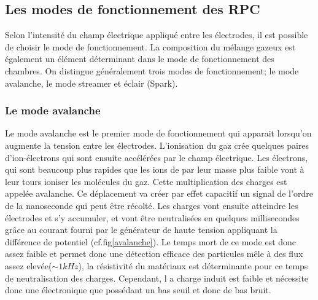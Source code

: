 \subsection{Les modes de fonctionnement des RPC}
Selon l'intensité du champ électrique appliqué  entre les électrodes, il est possible de choisir le mode de fonctionnement. La composition du mélange gazeux est également un élément déterminant dans le mode de fonctionnement des chambres. On distingue généralement trois modes de fonctionnement; le mode avalanche, le mode streamer et éclair (Spark).

\subsubsection{Le mode avalanche}
Le mode avalanche est le premier mode de fonctionnement qui apparait lorsqu'on augmente la tension entre les électrodes. L'ionisation du gaz crée quelques paires d'ion-électrons qui sont ensuite accélérées par le champ électrique. Les électrons, qui sont beaucoup plus rapides que les ions de par leur masse plus faible vont à leur tours ioniser les molécules du gaz. Cette multiplication des charges est appelée avalanche. Ce déplacement va créer par effet capacitif un signal de l'ordre de la nanoseconde qui peut être récolté. Les charges vont ensuite atteindre les électrodes et s'y accumuler, et vont être neutralisées en quelques millisecondes grâce au courant fourni par le générateur de haute tension appliquant la différence de potentiel (cf.fig\ref{avalanche}). Le temps mort de ce mode est donc assez faible et permet donc une détection efficace des particules mêle à des flux assez elevée($\sim1kHz$), la résistivité du matériaux est déterminante pour ce temps de neutralisation des charges. Cependant, l a charge induit est faible et nécessite donc une électronique que possédant un bas seuil et donc de bas bruit.


